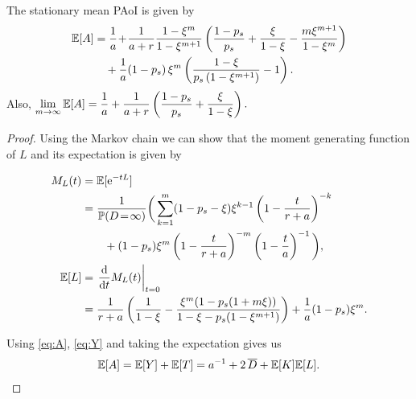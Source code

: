 \begin{proposition}\label{prop:meanPAoI}
    The stationary mean PAoI is given by
    \begin{align} \label{eq:PAoI}
        {\mathbb E}[A] &= \frac{1}{a}\!+\!\frac{1}{a+r} \frac{1-\xi^m}{1-\xi^{m+1}}
            \left( \frac{1-p_s}{p_s} + \frac{\xi}{1-\xi} - \frac{m\xi^{m+1}}{1-\xi^m} \right)\nonumber\\
            &\quad + \frac{1}{a}(1-p_s)\,\xi^m\left(\frac{1-\xi}{p_s\,(1-\xi^{m+1})}-1\right).
    \end{align}
    Also,\qquad\qquad
    $\displaystyle
        \lim_{m\to\infty}{\mathbb E}[A] = \frac{1}{a} + \frac{1}{a+r}\left(\frac{1-p_s}{p_s} + \frac{\xi}{1-\xi}\right).
    $
\end{proposition}
\begin{proof}
    Using the Markov chain we can show that the moment generating function of $L$ and its expectation is given by
    
    \begin{align}
        M_L(t) &= {\mathbb E}[\mathrm{e}^{-t L}] \nonumber\\
            &= \frac{1}{{\mathbb P}(D\!=\!\infty)} \bigg( \sum_{k=1}^m (1-p_s-\xi)\xi^{k-1} \left( 1 - \frac{t}{r+a} \right)^{-k} \nonumber\\
            &\qquad + (1-p_s) \xi^m \left( 1 - \frac{t}{r+a} \right)^{-m}\left( 1 - \frac{t}{a} \right)^{-1} \bigg),\nonumber\\
        {\mathbb E}[L] &= \left. \frac{\mathrm{d}}{\mathrm{d} t} M_L(t) \right|_{t=0} \label{eq:EL} \nonumber\\ 
            &= \frac{1}{r+a}\left( \frac{1}{1-\xi} - \frac{\xi^m(1-p_s(1+m\xi))}{1-\xi-p_s(1-\xi^{m+1})} \right) + \frac{1}{a}(1-p_s)\xi^m.
    \end{align}
    
    Using \eqref{eq:A}, \eqref{eq:Y} and taking the expectation gives us
    \begin{align*}
        {\mathbb E}[A] 
            = {\mathbb E}[Y] + {\mathbb E}[T]
            = a^{-1} + 2\,\overline{D} + {\mathbb E}[K] {\mathbb E}[L].
    \end{align*}
    

\end{proof}
